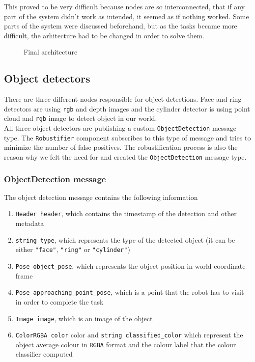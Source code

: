 \documentclass[12pt,a4paper]{article}
\begin{document}
	This proved to be very difficult because nodes are so interconnected, that if any part of the system didn't work as intended, it seemed as if nothing worked. Some parts of the system were discussed beforehand, but as the tasks became more difficult, the arhitecture had to be changed in order to solve them. \\ 
	
	\begin{figure}[h]
		\centering
		\caption{Final architecture}
		\label{fig:final_architecture}
	\end{figure}
	
	\subsection{Object detectors}
	There are three different nodes responsible for object detections. Face and ring detectors are using \texttt{rgb} and depth images and the cylinder detector is using point cloud and \texttt{rgb} image to detect object in our world. \\
	
	All three object detectors are publishing a custom \texttt{ObjectDetection} message type. The \texttt{Robustifier} component subscribes to this type of message and tries to minimize the number of false positives. The robustification process is also the reason why we felt the need for and created the \texttt{ObjectDetection} message type.
	
	\subsubsection{ObjectDetection message}
	The object detection message contains the following information
	\begin{enumerate}
		\item \texttt{Header header}, which contains the timestamp of the detection and other metadata
		\item \texttt{string type}, which represents the type of the detected object (it can be either \texttt{"face"}, \texttt{"ring"} or \texttt{"cylinder"})
		\item \texttt{Pose object\_pose}, which represents the object position in world coordinate frame
		\item \texttt{Pose approaching\_point\_pose}, which is a point that the robot has to visit in order to complete the task
		\item \texttt{Image image}, which is an image of the object
		\item \texttt{ColorRGBA color} color and \texttt{string classified\_color} which represent the object average colour in \texttt{RGBA} format and the colour label that the colour classifier computed
	\end{enumerate}
	
\end{document}
